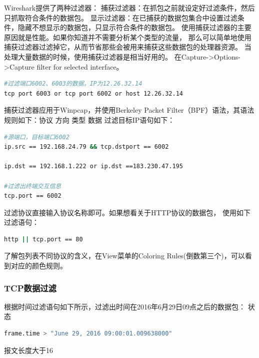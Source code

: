 \documentclass{book}
\begin{document}
Wireshark提供了两种过滤器：
捕获过滤器：在抓包之前就设定好过滤条件，然后只抓取符合条件的数据包。
显示过滤器：在已捕获的数据包集合中设置过滤条件，隐藏不想显示的数据包，只显示符合条件的数据包。
使用捕获过滤器的主要原因就是性能。如果你知道并不需要分析某个类型的流量，
那么可以简单地使用捕获过滤器过滤掉它，从而节省那些会被用来捕获这些数据包的处理器资源。
当处理大量数据的时候，使用捕获过滤器是相当好用的。
在Capture->Options->Capture filter for selected interface。

\begin{lstlisting}[language=Bash]
#过滤端口6002、6003的数据，IP为12.26.32.14
tcp port 6003 or tcp port 6002 or host 12.26.32.14
\end{lstlisting}

捕获过滤器应用于Winpcap，并使用Berkeley Packet Filter（BPF）语法，其语法规则如下：协议 方向 类型 数据
过滤目标IP语句如下：

\begin{lstlisting}[language=Bash]
#源端口，目标端口6002
ip.src == 192.168.24.79 && tcp.dstport == 6002

ip.dst == 192.168.1.222 or ip.dst ==183.230.47.195

#过滤出终端交互信息
tcp.port == 6002
\end{lstlisting}

过滤协议直接输入协议名称即可。如果想看关于HTTP协议的数据包，
使用如下过滤语句：

\begin{lstlisting}[language=Bash]
http || tcp.port == 80
\end{lstlisting}

了解包列表不同协议的含义，在View菜单的Coloring Rules(倒数第三个)，可以看到对应的颜色规则。

\subsubsection{TCP数据过滤}

根据时间过滤语句如下所示，过滤出时间在2016年6月29日09点之后的数据包：
状态
\begin{lstlisting}[language=Bash]
frame.time > "June 29, 2016 09:00:01.009638000"
\end{lstlisting}

报文长度大于16
\end{document}
